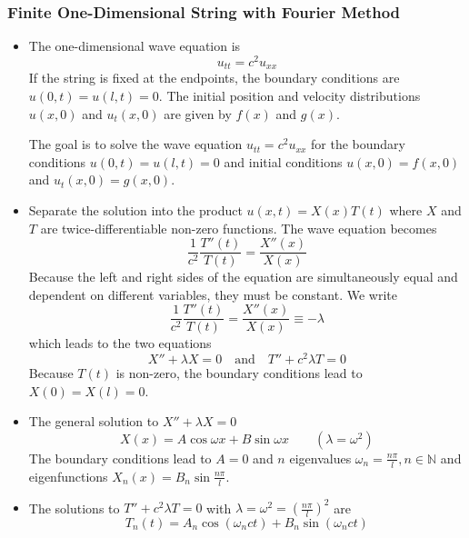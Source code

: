 \documentclass[11pt, a4paper]{article}
\begin{document}
\subsubsection{Finite One-Dimensional String with Fourier Method}
\begin{itemize}
	\item The one-dimensional wave equation is
	\begin{equation*}
		u_{tt} = c^2u_{xx}
	\end{equation*}
	If the string is fixed at the endpoints, the boundary conditions are $ u(0, t) = u(l, t) = 0 $. The initial position and velocity distributions $ u(x, 0) $ and $ u_{t}(x, 0) $ are given by $ f(x) $ and $ g(x) $.
	
	The goal is to solve the wave equation $ u_{tt} = c^2u_{xx} $ for the boundary conditions $ u(0, t) = u(l, t) = 0 $ and initial conditions $ u(x, 0) = f(x, 0) $ and $ u_{t}(x, 0) = g(x, 0) $.
	
	\item Separate the solution into the product $ u(x, t) = X(x)T(t) $ where $ X $ and $ T $ are twice-differentiable non-zero functions. The wave equation becomes
	\begin{equation*}
		\frac{1}{c^{2}}\frac{T''(t)}{T(t)} = \frac{X''(x)}{X(x)}
	\end{equation*}
	Because the left and right sides of the equation are simultaneously equal and dependent on different variables, they must be constant. We write
	\begin{equation*}
  		\frac{1}{c^{2}}\frac{T''(t)}{T(t)} = \frac{X''(x)}{X(x)} \equiv - \lambda
  	\end{equation*}
  	which leads to the two equations
  	\begin{equation*}
  		X'' + \lambda X = 0 \quad \text{and} \quad T'' + c^{2}\lambda T = 0
  	\end{equation*}
  	Because $ T(t) $ is non-zero, the boundary conditions lead to $ X(0) = X(l) = 0$. 
  	
  	\item The general solution to $ X'' + \lambda X = 0 $ 
  	\begin{equation*}
  		X(x) = A \cos \omega x + B \sin \omega x \qquad (\lambda = \omega^{2})
  	\end{equation*}
  	The boundary conditions lead to $ A = 0 $ and $ n $ eigenvalues $ \omega_{n} = \frac{n\pi}{l}, n \in \mathbb{N} $ and eigenfunctions $ X_{n}(x) = B_n \sin \frac{n\pi}{l} $.
  	
  	\item The solutions to $ T'' + c^{2}\lambda T = 0 $ with $ \lambda = \omega^{2} = \left(\frac{n\pi}{l}\right)^{2} $ are
  	\begin{equation*}
  		T_{n}(t) = A_n \cos(\omega_n c t ) + B_n \sin( \omega_n c t)
  	\end{equation*}
  	

\end{itemize}
\end{document}
